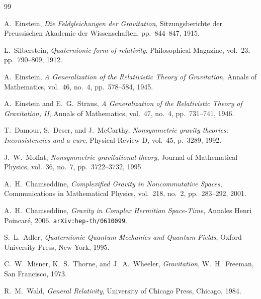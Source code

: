 \documentclass[12pt,a4paper]{article}
\theoremstyle{definition}
\theoremstyle{remark}
\begin{document}
\begin{thebibliography}{99}

A.~Einstein,
\textit{Die Feldgleichungen der Gravitation},
Sitzungsberichte der Preussischen Akademie der Wissenschaften,
pp.\ 844--847, 1915.

L.~Silberstein,
\textit{Quaternionic form of relativity},
Philosophical Magazine, vol.~23, pp.\ 790--809, 1912.

A.~Einstein,
\textit{A Generalization of the Relativistic Theory of Gravitation},
Annals of Mathematics, vol.~46, no.~4, pp.\ 578--584, 1945.

A.~Einstein and E.~G.~Straus,
\textit{A Generalization of the Relativistic Theory of Gravitation, II},
Annals of Mathematics, vol.~47, no.~4, pp.\ 731--741, 1946.

T.~Damour, S.~Deser, and J.~McCarthy,
\textit{Nonsymmetric gravity theories: Inconsistencies and a cure},
Physical Review D, vol.~45, p.~3289, 1992.

J.~W.~Moffat,
\textit{Nonsymmetric gravitational theory},
Journal of Mathematical Physics, vol.~36, no.~7, pp.\ 3722--3732, 1995.

A.~H.~Chamseddine,
\textit{Complexified Gravity in Noncommutative Spaces},
Communications in Mathematical Physics, vol.~218, no.~2, pp.\ 283--292, 2001.

A.~H.~Chamseddine,
\textit{Gravity in Complex Hermitian Space-Time},
Annales Henri Poincar\'{e}, 2006.
\texttt{arXiv:hep-th/0610099}.

S.~L.~Adler,
\textit{Quaternionic Quantum Mechanics and Quantum Fields},
Oxford University Press, New York, 1995.

C.~W.~Misner, K.~S.~Thorne, and J.~A.~Wheeler,
\textit{Gravitation},
W.~H.~Freeman, San Francisco, 1973.

R.~M.~Wald,
\textit{General Relativity},
University of Chicago Press, Chicago, 1984.

\end{thebibliography}
\end{document}
